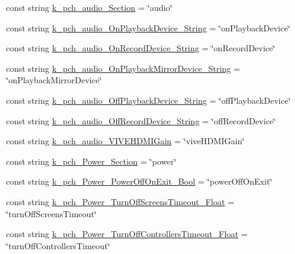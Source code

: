 \begin{DoxyCompactItemize}
\item 
const string \mbox{\hyperlink{class_valve_1_1_v_r_1_1_open_v_r_a63cc22d45836b277f4354ea3d08047e9}{k\+\_\+pch\+\_\+audio\+\_\+\+Section}} = \char`\"{}audio\char`\"{}
\item 
const string \mbox{\hyperlink{class_valve_1_1_v_r_1_1_open_v_r_aae615d08a7b80049fcbcf377af7c0e09}{k\+\_\+pch\+\_\+audio\+\_\+\+On\+Playback\+Device\+\_\+\+String}} = \char`\"{}on\+Playback\+Device\char`\"{}
\item 
const string \mbox{\hyperlink{class_valve_1_1_v_r_1_1_open_v_r_a3baf4cc624bf2c8f54b9b9b8ca997835}{k\+\_\+pch\+\_\+audio\+\_\+\+On\+Record\+Device\+\_\+\+String}} = \char`\"{}on\+Record\+Device\char`\"{}
\item 
const string \mbox{\hyperlink{class_valve_1_1_v_r_1_1_open_v_r_af1701bdf6bd47f1e63e7161694b870b9}{k\+\_\+pch\+\_\+audio\+\_\+\+On\+Playback\+Mirror\+Device\+\_\+\+String}} = \char`\"{}on\+Playback\+Mirror\+Device\char`\"{}
\item 
const string \mbox{\hyperlink{class_valve_1_1_v_r_1_1_open_v_r_af467c1211860a8f4a0c97c6c40542c03}{k\+\_\+pch\+\_\+audio\+\_\+\+Off\+Playback\+Device\+\_\+\+String}} = \char`\"{}off\+Playback\+Device\char`\"{}
\item 
const string \mbox{\hyperlink{class_valve_1_1_v_r_1_1_open_v_r_a72b9b626c6bd9b0cda2e56dfbd14f7de}{k\+\_\+pch\+\_\+audio\+\_\+\+Off\+Record\+Device\+\_\+\+String}} = \char`\"{}off\+Record\+Device\char`\"{}
\item 
const string \mbox{\hyperlink{class_valve_1_1_v_r_1_1_open_v_r_a16ebe555d2188bc7c9de1dfe60390752}{k\+\_\+pch\+\_\+audio\+\_\+\+V\+I\+V\+E\+H\+D\+M\+I\+Gain}} = \char`\"{}vive\+H\+D\+M\+I\+Gain\char`\"{}
\item 
const string \mbox{\hyperlink{class_valve_1_1_v_r_1_1_open_v_r_a6e5aa94056985aa3a69a481be4ae7106}{k\+\_\+pch\+\_\+\+Power\+\_\+\+Section}} = \char`\"{}power\char`\"{}
\item 
const string \mbox{\hyperlink{class_valve_1_1_v_r_1_1_open_v_r_a65c361b824af2c10c525a370c7833d47}{k\+\_\+pch\+\_\+\+Power\+\_\+\+Power\+Off\+On\+Exit\+\_\+\+Bool}} = \char`\"{}power\+Off\+On\+Exit\char`\"{}
\item 
const string \mbox{\hyperlink{class_valve_1_1_v_r_1_1_open_v_r_a41490c1a912e94946b0e14dd3f370767}{k\+\_\+pch\+\_\+\+Power\+\_\+\+Turn\+Off\+Screens\+Timeout\+\_\+\+Float}} = \char`\"{}turn\+Off\+Screens\+Timeout\char`\"{}
\item 
const string \mbox{\hyperlink{class_valve_1_1_v_r_1_1_open_v_r_a7337e7f04b6d12cfcd7dedbe46afc794}{k\+\_\+pch\+\_\+\+Power\+\_\+\+Turn\+Off\+Controllers\+Timeout\+\_\+\+Float}} = \char`\"{}turn\+Off\+Controllers\+Timeout\char`\"{}

\end{DoxyCompactItemize}
